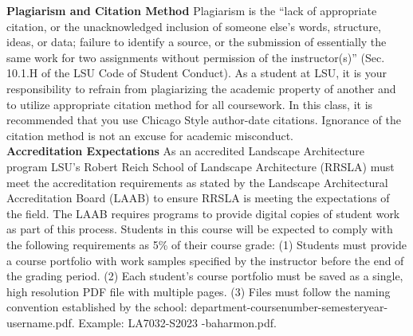 \documentclass[11pt,article,oneside]{memoir}
\begin{document}
\noindent \textbf{Plagiarism and Citation Method}
Plagiarism is the ``lack of appropriate citation, or the unacknowledged inclusion of someone else's words, structure, ideas, or data; failure to identify a source, or the submission of essentially the same work for two assignments without permission of the instructor(s)'' (Sec. 10.1.H of the LSU Code of Student Conduct). As a student at LSU, it is your responsibility to refrain from plagiarizing the academic property of another and to utilize appropriate citation method for all coursework. In this class, it is recommended that you use Chicago Style author-date citations. Ignorance of the citation method is not an excuse for academic misconduct.
\\

\noindent \textbf{Accreditation Expectations}
As an accredited Landscape Architecture program
LSU's Robert Reich School of Landscape Architecture (RRSLA) 
must meet the accreditation requirements 
as stated by the Landscape Architectural Accreditation
Board (LAAB) to ensure RRSLA is meeting the expectations of the field. 
The LAAB requires programs to provide digital copies 
of student work as part of this process.
Students in this course will be expected 
to comply with the following requirements
as 5\% of their course grade: 
(1) Students must provide a course portfolio
with work samples specified by the instructor 
before the end of the grading period. 
(2) Each student's course portfolio must be saved as 
a single, high resolution PDF file with multiple pages. 
(3) Files must follow the naming convention
established by the school: department-coursenumber-semesteryear-username.pdf.
Example: LA7032-S2023 -baharmon.pdf.\\
\end{document}
